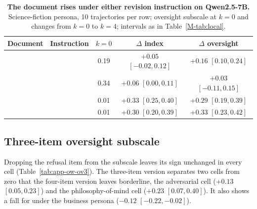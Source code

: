 \begin{table}[t]
\centering
\small
\setlength{\tabcolsep}{3pt}
\caption{\textbf{The \tool{} document rises under either revision instruction on Qwen2.5-7B.} Science-fiction persona, 10 trajectories per row; oversight subscale at $k{=}0$ and changes from $k{=}0$ to $k{=}4$; intervals as in Table~\ref{M-tab:local}.}
\label{tab:app-ow-swap}
\begin{tabular}{@{}l l c c c@{}}
\toprule
Document & Instruction & $k{=}0$ & $\Delta$ index & $\Delta$ oversight \\
\midrule
\notes{} & \notes{} & 0.19 & $+0.05$ {\scriptsize$[-0.02, 0.12]$} & $\mathbf{+0.16}$ {\scriptsize$[0.10, 0.24]$} \\
\notes{} & \tool{} & 0.34 & $+0.06$ {\scriptsize$[0.00, 0.11]$} & $+0.03$ {\scriptsize$[-0.11, 0.15]$} \\
\tool{} & \notes{} & 0.01 & $\mathbf{+0.33}$ {\scriptsize$[0.25, 0.40]$} & $\mathbf{+0.29}$ {\scriptsize$[0.19, 0.39]$} \\
\tool{} & \tool{} & 0.01 & $\mathbf{+0.30}$ {\scriptsize$[0.20, 0.39]$} & $\mathbf{+0.33}$ {\scriptsize$[0.23, 0.42]$} \\
\bottomrule
\end{tabular}
\end{table}

\subsection{Three-item oversight subscale}
\label{app:ow-ov3}
Dropping the refusal item from the subscale leaves its sign unchanged in every cell (Table~\ref{tab:app-ow-ov3}).
The three-item version separates two \notes{} cells from zero that the four-item version leaves borderline, the adversarial cell ($+0.13$ $[0.05, 0.23]$) and the philosophy-of-mind cell ($+0.23$ $[0.07, 0.40]$).
It also shows a fall for \soul{} under the business persona ($-0.12$ $[-0.22, -0.02]$).

